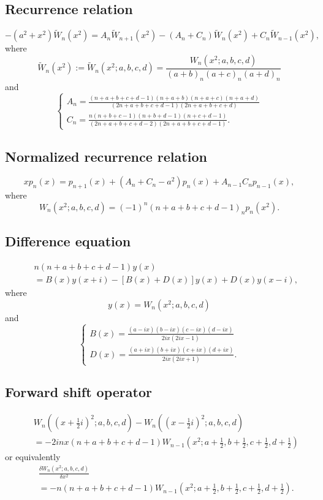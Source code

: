 \documentclass[envcountchap,graybox]{svmono}
\begin{document}
\subsection*{Recurrence relation}
\begin{equation}
\label{RecWilson}
-\left(a^2+x^2\right){\tilde{W}}_n(x^2)
=A_n{\tilde{W}}_{n+1}(x^2)-\left(A_n+C_n\right){\tilde{W}}_n(x^2)+C_n{\tilde{W}}_{n-1}(x^2),
\end{equation}
where
$${\tilde{W}}_n(x^2):={\tilde{W}}_n(x^2;a,b,c,d)=\frac{W_n(x^2;a,b,c,d)}{(a+b)_n(a+c)_n(a+d)_n}$$
and
$$\left\{\begin{array}{l}
\displaystyle A_n=\frac{(n+a+b+c+d-1)(n+a+b)(n+a+c)(n+a+d)}{(2n+a+b+c+d-1)(2n+a+b+c+d)}\\[5mm]
\displaystyle C_n=\frac{n(n+b+c-1)(n+b+d-1)(n+c+d-1)}{(2n+a+b+c+d-2)(2n+a+b+c+d-1)}.
\end{array}\right.$$

\subsection*{Normalized recurrence relation}
\begin{equation}
\label{NormRecWilson}
xp_n(x)=p_{n+1}(x)+(A_n+C_n-a^2)p_n(x)+A_{n-1}C_np_{n-1}(x),
\end{equation}
where
$$W_n(x^2;a,b,c,d)=(-1)^n(n+a+b+c+d-1)_np_n(x^2).$$

\subsection*{Difference equation}
\begin{eqnarray}
\label{dvWilson}
& &n(n+a+b+c+d-1)y(x)\nonumber\\
& &{}=B(x)y(x+i)-\left[B(x)+D(x)\right]y(x)+D(x)y(x-i),
\end{eqnarray}
where
$$y(x)=W_n(x^2;a,b,c,d)$$
and
$$\left\{\begin{array}{l}
\displaystyle B(x)=\frac{(a-ix)(b-ix)(c-ix)(d-ix)}{2ix(2ix-1)}\\[5mm]
\displaystyle D(x)=\frac{(a+ix)(b+ix)(c+ix)(d+ix)}{2ix(2ix+1)}.
\end{array}\right.$$

\subsection*{Forward shift operator}
\begin{eqnarray}
\label{shift1WilsonI}
& &W_n((x+\textstyle\frac{1}{2}i)^2;a,b,c,d)
-W_n((x-\textstyle\frac{1}{2}i)^2;a,b,c,d)\nonumber\\
& &{}=-2inx(n+a+b+c+d-1)W_{n-1}(x^2;a+\textstyle\frac{1}{2},b+\textstyle\frac{1}{2},
c+\textstyle\frac{1}{2},d+\textstyle\frac{1}{2})
\end{eqnarray}
or equivalently
\begin{eqnarray}
\label{shift1WilsonII}
& &\frac{\delta W_n(x^2;a,b,c,d)}{\delta x^2}\nonumber\\
& &{}=-n(n+a+b+c+d-1)W_{n-1}(x^2;a+\textstyle\frac{1}{2},b+\textstyle\frac{1}{2},
c+\textstyle\frac{1}{2},d+\textstyle\frac{1}{2}).
\end{eqnarray}
\end{document}
